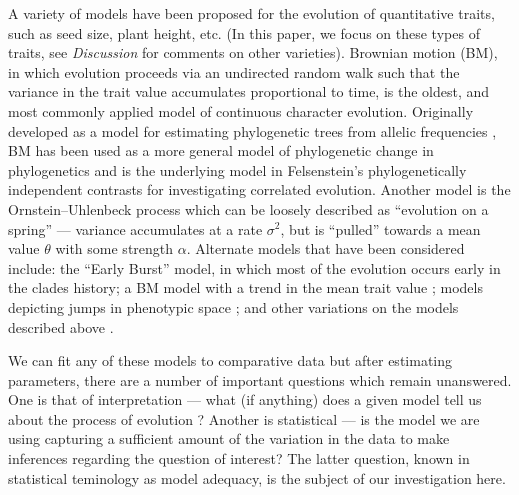 \documentclass[12pt]{article}
\begin{document}
A variety of models have been proposed for the evolution of quantitative traits, such as seed size, plant height, etc. (In this paper, we focus on these types of traits, see \textit{Discussion} for comments on other varieties). Brownian motion (BM), in which evolution proceeds via an undirected random walk such that the variance in the trait value accumulates proportional to time, is the oldest, and most commonly applied model of continuous character evolution. Originally developed as a model for estimating phylogenetic trees from allelic frequencies \citep{EC1964}, BM has been used as a more general model of phylogenetic change in phylogenetics \citep{Felsenstein1973, Thompson1975, Felsenstein1988} and is the underlying model in Felsenstein's phylogenetically independent contrasts \citep[PICs;][]{Felsenstein1985} for investigating correlated evolution. Another model is the Ornstein--Uhlenbeck process \citep[OU;][]{Hansen1997} which can be loosely described as ``evolution on a spring'' --- variance accumulates at a rate $\sigma^2$, but is ``pulled'' towards a mean value $\theta$ with some strength $\alpha$. Alternate models that have been considered include: the ``Early Burst'' \citep[EB;][]{Blomberg2003, Harmon2010, SlaterPennell} model, in which most of the evolution occurs early in the clades history; a BM model with a trend in the mean trait value \citep{Hunt2006}; models depicting jumps in phenotypic space \citep{Landis2012, Eastmanlevy}; and other variations on the models described above \citep[e.g.][]{Pagel1997, Pagel1999, ButlerKing2004, Omeara2006, Eastman2011, Beaulieu2012, SlaterMEE}.

We can fit any of these models to comparative data but after estimating parameters, there are a number of important questions which remain unanswered. One is that of interpretation --- what (if anything) does a given model tell us about the process of evolution \citep{HansenMartins1996, Hansen2012, PennellHarmon}? Another is statistical --- is the model we are using capturing a sufficient amount of the variation in the data to make inferences regarding the question of interest? The latter question, known in statistical teminology as model adequacy, is the subject of our investigation here.
\end{document}
